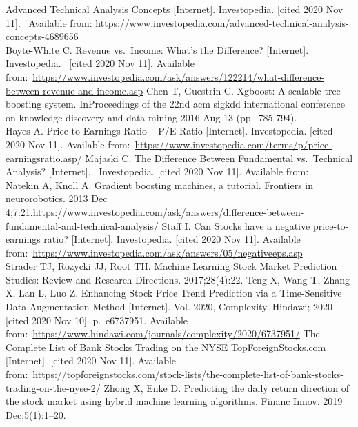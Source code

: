 \documentclass[11pt,]{article}
\begin{document}
Advanced Technical Analysis Concepts {[}Internet{]}. Investopedia.
{[}cited 2020 Nov 11{]}.~ Available from:
\url{https://www.investopedia.com/advanced-technical-analysis-concepts-4689656}\\
Boyte-White C. Revenue vs.~Income: What's the Difference?
{[}Internet{]}. Investopedia.~ {[}cited 2020 Nov 11{]}. Available
from:~\url{https://www.investopedia.com/ask/answers/122214/what-difference-between-revenue-and-income.asp}
Chen T, Guestrin C. Xgboost: A scalable tree boosting system.
InProceedings of the 22nd acm sigkdd international conference on
knowledge discovery and data mining 2016 Aug 13 (pp.~785-794).\\
Hayes A. Price-to-Earnings Ratio -- P/E Ratio {[}Internet{]}.
Investopedia. {[}cited 2020 Nov 11{]}. Available
from:~\url{https://www.investopedia.com/terms/p/price-earningsratio.asp/}
Majaski C. The Difference Between Fundamental vs.~Technical Analysis?
{[}Internet{]}.~ Investopedia. {[}cited 2020 Nov 11{]}. Available
from:\\
Natekin A, Knoll A. Gradient boosting machines, a tutorial. Frontiers in
neurorobotics. 2013 Dec
4;7:21.https://www.investopedia.com/ask/answers/difference-between-fundamental-and-technical-analysis/
Staff I. Can Stocks have a negative price-to-earnings ratio?
{[}Internet{]}. Investopedia. {[}cited 2020 Nov 11{]}. Available
from:~\url{https://www.investopedia.com/ask/answers/05/negativeeps.asp}\\
Strader TJ, Rozycki JJ, Root TH. Machine Learning Stock Market
Prediction Studies: Review and Research Directions. 2017;28(4):22. Teng
X, Wang T, Zhang X, Lan L, Luo Z. Enhancing Stock Price Trend Prediction
via a Time-Sensitive Data Augmentation Method {[}Internet{]}. Vol. 2020,
Complexity. Hindawi; 2020 {[}cited 2020 Nov 10{]}. p.~e6737951.
Available
from:~\url{https://www.hindawi.com/journals/complexity/2020/6737951/}
The Complete List of Bank Stocks Trading on the NYSE \textbar{}
TopForeignStocks.com {[}Internet{]}. {[}cited 2020 Nov 11{]}. Available
from:~\url{https://topforeignstocks.com/stock-lists/the-complete-list-of-bank-stocks-trading-on-the-nyse-2/}
Zhong X, Enke D. Predicting the daily return direction of the stock
market using hybrid machine learning algorithms. Financ Innov. 2019
Dec;5(1):1--20.





\newpage
\singlespacing 
\end{document}
